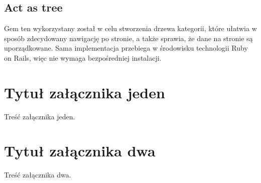 \documentclass[brudnopis]{xmgr}
\begin{document}
\section{Act as tree}
Gem ten wykorzystany został w celu stworzenia drzewa kategorii, które ułatwia w sposób zdecydowany nawigację
po stronie, a także sprawia, że dane na stronie są uporządkowane. Sama implementacja przebiega w środowisku
technologii Ruby on Rails, więc nie wymaga bezpośredniej instalacji.

\summary

\appendix
\chapter{Tytuł załącznika jeden}

Treść załącznika jeden.

\chapter{Tytuł załącznika dwa}

Treść załącznika dwa.




\listoftables

\listoffigures

\oswiadczenie
\end{document}
